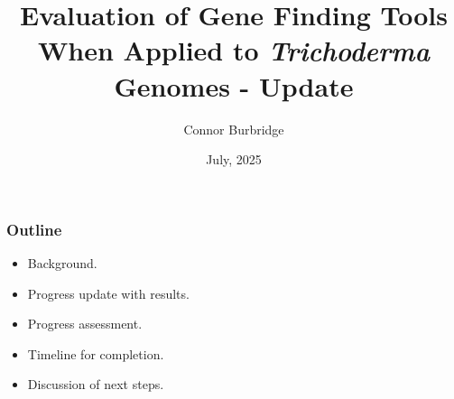\documentclass[t]{beamer}
\title{Evaluation of Gene Finding Tools When Applied to \textit{Trichoderma} Genomes - Update}
\date{July, 2025}
\author{Connor Burbridge}
\institute{Department of Computer Science}
\begin{document}
\begin{frame}
	\titlepage
\end{frame}

\begin{frame}
	\frametitle{Outline} 

	\begin{itemize}
		\item Background.
		\item Progress update with results.
		\item Progress assessment.
		\item Timeline for completion.	
		\item Discussion of next steps.
	\end{itemize}
\end{frame}

\end{document}
